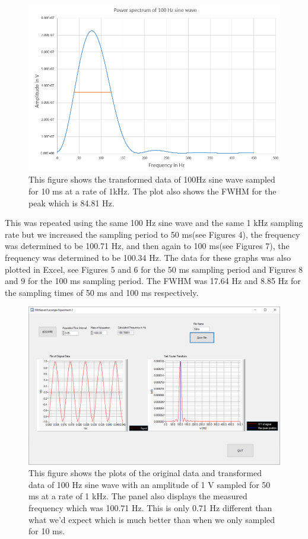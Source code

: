 \documentclass{article}
\begin{document}
\begin{figure}[H]
\includegraphics[scale=0.55,center]{Fouriersine10ms.PNG}
\caption{This figure shows the transformed data of 100Hz sine wave sampled for 10 ms at a rate of 1kHz.  The plot also shows the FWHM for the peak which is 84.81 Hz.}
\end{figure}

This was repeated using the same 100 Hz sine wave and the same 1 kHz sampling rate but we increased the sampling period to 50 ms(see Figures 4), the frequency was determined to be 100.71 Hz, and then again to 100 ms(see Figures 7), the frequency was determined to be 100.34 Hz.  The data for these graphs was also plotted in Excel, see Figures 5 and 6 for the 50 ms sampling period and Figures 8 and 9 for the 100 ms sampling period.  The FWHM was 17.64 Hz and 8.85 Hz for the sampling times of 50 ms and 100 ms respectively.

\begin{figure}[H]
\includegraphics[scale=0.5,center]{Sine50ms.png}
\caption{This figure shows the plots of the original data and transformed data of 100 Hz sine wave with an amplitude of 1 V sampled for 50 ms at a rate of 1 kHz.  The panel also displays the measured frequency which was 100.71 Hz.  This is only 0.71 Hz different than what we'd expect which is much better than when we only sampled for 10 ms.}
\end{figure}
\end{document}
